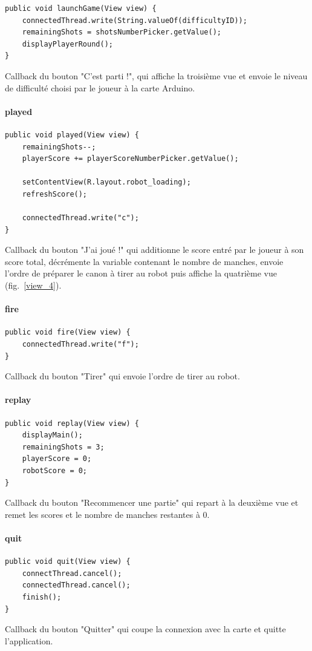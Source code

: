 \begin{lstlisting}
public void launchGame(View view) {
	connectedThread.write(String.valueOf(difficultyID));
	remainingShots = shotsNumberPicker.getValue();
	displayPlayerRound();
}
\end{lstlisting}
Callback du bouton "C'est parti !", qui affiche la troisième vue et envoie le niveau de difficulté choisi par le joueur à la carte Arduino.

\paragraph{played}

\begin{lstlisting}
public void played(View view) {
	remainingShots--;
	playerScore += playerScoreNumberPicker.getValue();

	setContentView(R.layout.robot_loading);
	refreshScore();

	connectedThread.write("c");
}
\end{lstlisting}
Callback du bouton "J'ai joué !" qui additionne le score entré par le joueur à son score total, décrémente la variable contenant le nombre de manches, envoie l'ordre de préparer le canon à tirer au robot puis affiche la quatrième vue (fig.~\ref{view_4}).

\paragraph{fire}

\begin{lstlisting}
public void fire(View view) {
	connectedThread.write("f");
}
\end{lstlisting}
Callback du bouton "Tirer" qui envoie l'ordre de tirer au robot.

\paragraph{replay}

\begin{lstlisting}
public void replay(View view) {
	displayMain();
	remainingShots = 3;
	playerScore = 0;
	robotScore = 0;
}
\end{lstlisting}
Callback du bouton "Recommencer une partie" qui repart à la deuxième vue et remet les scores et le nombre de manches restantes à 0.

\paragraph{quit}

\begin{lstlisting}
public void quit(View view) {
	connectThread.cancel();
	connectedThread.cancel();
	finish();
}
\end{lstlisting}
Callback du bouton "Quitter" qui coupe la connexion avec la carte et quitte l'application.

